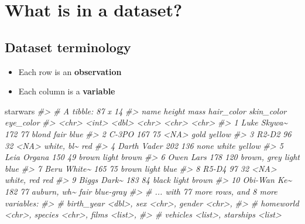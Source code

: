 \documentclass[
]{book}
\newenvironment{Shaded}{\begin{snugshade}}{\end{snugshade}}
\newcommand{\CommentTok}[1]{\textcolor[rgb]{0.56,0.35,0.01}{\textit{#1}}}
\newcommand{\NormalTok}[1]{#1}
\providecommand{\tightlist}{%
  \setlength{\itemsep}{0pt}\setlength{\parskip}{0pt}}
\theoremstyle{definition}
\theoremstyle{definition}
\theoremstyle{definition}
\theoremstyle{definition}
\theoremstyle{remark}
\begin{document}
\hypertarget{what-is-in-a-dataset-1}{%
\chapter{What is in a dataset?}\label{what-is-in-a-dataset-1}}

\hypertarget{dataset-terminology-1}{%
\section{Dataset terminology}\label{dataset-terminology-1}}

\begin{itemize}
\tightlist
\item
  Each row is an \textbf{observation}
\item
  Each column is a \textbf{variable}
\end{itemize}

\begin{Shaded}
\begin{Highlighting}[]
\NormalTok{starwars}
\CommentTok{\#\textgreater{} \# A tibble: 87 x 14}
\CommentTok{\#\textgreater{}    name        height  mass hair\_color  skin\_color eye\_color}
\CommentTok{\#\textgreater{}    \textless{}chr\textgreater{}        \textless{}int\textgreater{} \textless{}dbl\textgreater{} \textless{}chr\textgreater{}       \textless{}chr\textgreater{}      \textless{}chr\textgreater{}    }
\CommentTok{\#\textgreater{}  1 Luke Skywa\textasciitilde{}    172    77 blond       fair       blue     }
\CommentTok{\#\textgreater{}  2 C{-}3PO          167    75 \textless{}NA\textgreater{}        gold       yellow   }
\CommentTok{\#\textgreater{}  3 R2{-}D2           96    32 \textless{}NA\textgreater{}        white, bl\textasciitilde{} red      }
\CommentTok{\#\textgreater{}  4 Darth Vader    202   136 none        white      yellow   }
\CommentTok{\#\textgreater{}  5 Leia Organa    150    49 brown       light      brown    }
\CommentTok{\#\textgreater{}  6 Owen Lars      178   120 brown, grey light      blue     }
\CommentTok{\#\textgreater{}  7 Beru White\textasciitilde{}    165    75 brown       light      blue     }
\CommentTok{\#\textgreater{}  8 R5{-}D4           97    32 \textless{}NA\textgreater{}        white, red red      }
\CommentTok{\#\textgreater{}  9 Biggs Dark\textasciitilde{}    183    84 black       light      brown    }
\CommentTok{\#\textgreater{} 10 Obi{-}Wan Ke\textasciitilde{}    182    77 auburn, wh\textasciitilde{} fair       blue{-}gray}
\CommentTok{\#\textgreater{} \# ... with 77 more rows, and 8 more variables:}
\CommentTok{\#\textgreater{} \#   birth\_year \textless{}dbl\textgreater{}, sex \textless{}chr\textgreater{}, gender \textless{}chr\textgreater{},}
\CommentTok{\#\textgreater{} \#   homeworld \textless{}chr\textgreater{}, species \textless{}chr\textgreater{}, films \textless{}list\textgreater{},}
\CommentTok{\#\textgreater{} \#   vehicles \textless{}list\textgreater{}, starships \textless{}list\textgreater{}}
\end{Highlighting}
\end{Shaded}
\end{document}
